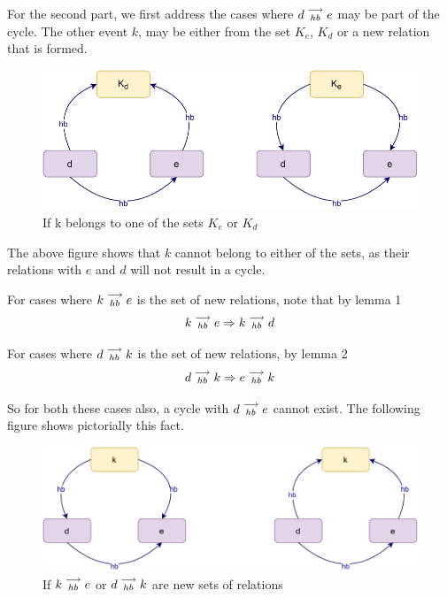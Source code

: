     For the second part, we first address the cases where $d\stackrel{\longrightarrow}{_{hb}}e$ may be part of the cycle. The other event $k$, may be either from the set $K_e$, $K_d$ or a new relation that is formed.

    \begin{figure}[H]
        \centering
        \includegraphics[scale=0.7]{Q4(a)_1.pdf}
        \caption{If k belongs to one of the sets $K_e$ or $K_d$}
        \label{fig:my_label}
    \end{figure}

    The above figure shows that $k$ cannot belong to either of the sets, as their relations with $e$ and $d$ will not result in a cycle. 

    For cases where $k\stackrel{\longrightarrow}{_{hb}}e$ is the set of new relations, note that by lemma 1
    \[
        k\stackrel{\longrightarrow}{_{hb}}e \Rightarrow k\stackrel{\longrightarrow}{_{hb}}d
    \]

    For cases where $d\stackrel{\longrightarrow}{_{hb}}k$ is the set of new relations, by lemma 2
    \[
        d\stackrel{\longrightarrow}{_{hb}}k \Rightarrow e\stackrel{\longrightarrow}{_{hb}}k
    \]

    So for both these cases also, a cycle with $d\stackrel{\longrightarrow}{_{hb}}e$ cannot exist. The following figure shows pictorially this fact. 
    \begin{figure}[H]
        \centering
        \includegraphics[scale=0.7]{Q4(a)_2.pdf}
        \caption{If $k\stackrel{\longrightarrow}{_{hb}}e$ or $d\stackrel{\longrightarrow}{_{hb}}k$ are new sets of relations}
        \label{fig:my_label}
    \end{figure}

